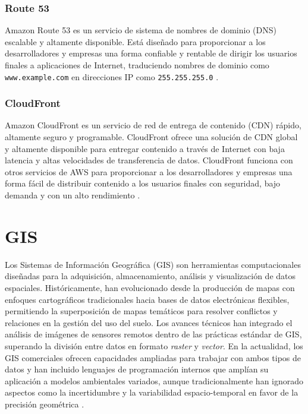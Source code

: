 \subsubsection{Route 53}
Amazon Route 53 es un servicio de sistema de nombres de dominio (DNS) escalable
y altamente disponible. Está diseñado para proporcionar a los desarrolladores
y empresas una forma confiable y rentable de dirigir los usuarios finales a
aplicaciones de Internet, traduciendo nombres de dominio como \texttt{www.example.com}
en direcciones IP como \texttt{255.255.255.0} \cite{cloud2011amazon}.

\subsubsection{CloudFront}
Amazon CloudFront es un servicio de red de entrega de contenido (CDN) rápido,
altamente seguro y programable. CloudFront ofrece una solución de CDN global
y altamente disponible para entregar contenido a través de Internet con baja
latencia y altas velocidades de transferencia de datos. CloudFront funciona
con otros servicios de AWS para proporcionar a los desarrolladores y empresas
una forma fácil de distribuir contenido a los usuarios finales con seguridad,
bajo demanda y con un alto rendimiento \cite{cloud2011amazon}.

\section{GIS}

Los Sistemas de Información Geográfica (GIS) son herramientas computacionales
diseñadas para la adquisición, almacenamiento, análisis y visualización de datos
espaciales. Históricamente, han evolucionado desde la producción de mapas con
enfoques cartográficos tradicionales hacia bases de datos electrónicas flexibles,
permitiendo la superposición de mapas temáticos para resolver conflictos y
relaciones en la gestión del uso del suelo. Los avances técnicos han integrado el
análisis de imágenes de sensores remotos dentro de las prácticas estándar de GIS,
superando la división entre datos en formato \textit{raster} y \textit{vector}. En
la actualidad, los GIS comerciales ofrecen capacidades ampliadas para trabajar con
ambos tipos de datos y han incluido lenguajes de programación internos que amplían
su aplicación a modelos ambientales variados, aunque tradicionalmente han ignorado
aspectos como la incertidumbre y la variabilidad espacio-temporal en favor de la
precisión geométrica \cite{burrough2001gis}.

